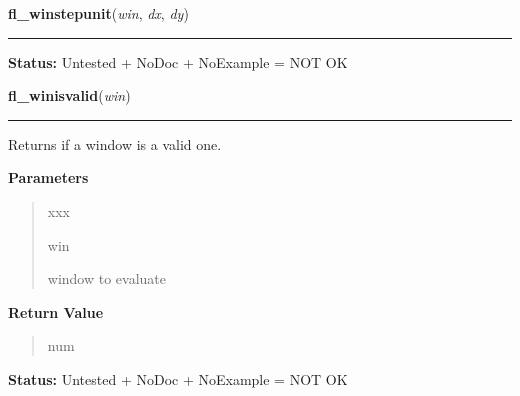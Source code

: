     \label{xformslib:library:fl_winstepsize}

    \vspace{0.5ex}

\hspace{.8\funcindent}\begin{boxedminipage}{\funcwidth}

    \raggedright \textbf{fl\_winstepunit}(\textit{win}, \textit{dx}, \textit{dy})

    \vspace{-1.5ex}

    \rule{\textwidth}{0.5\fboxrule}
\setlength{\parskip}{2ex}
\setlength{\parskip}{1ex}
\textbf{Status:} Untested + NoDoc + NoExample = NOT OK



    \end{boxedminipage}

    \label{xformslib:library:fl_winisvalid}

    \vspace{0.5ex}

\hspace{.8\funcindent}\begin{boxedminipage}{\funcwidth}

    \raggedright \textbf{fl\_winisvalid}(\textit{win})

    \vspace{-1.5ex}

    \rule{\textwidth}{0.5\fboxrule}
\setlength{\parskip}{2ex}
    Returns if a window is a valid one.

\setlength{\parskip}{1ex}
      \textbf{Parameters}
      \vspace{-1ex}

      \begin{quote}
        \begin{Ventry}{xxx}

          \item[win]

          window to evaluate

        \end{Ventry}

      \end{quote}

      \textbf{Return Value}
    \vspace{-1ex}

      \begin{quote}
      num

      \end{quote}

\textbf{Status:} Untested + NoDoc + NoExample = NOT OK



    \end{boxedminipage}

